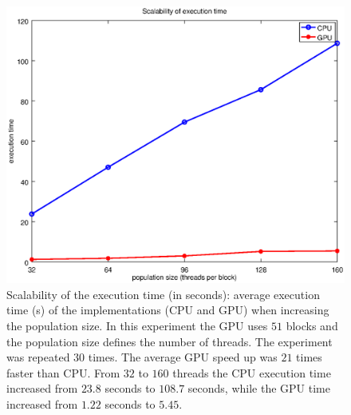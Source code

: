 \documentclass{article}
\begin{document}


    \begin{figure}[!htb]
        \centering
        \includegraphics[width=.7\textwidth]{../img/scalability_schafferf7_time.eps}
        \caption{Scalability of the execution time (in seconds): average execution time (s) of the implementations (CPU and GPU) when increasing the population size. In this experiment the GPU uses $51$ blocks and the population size defines the number of threads. The experiment was repeated $30$ times. The average GPU speed up was $21$ times faster than CPU. From $32$ to $160$  threads the CPU execution time increased from $23.8$ seconds to $108.7$ seconds, while the GPU time increased from $1.22$ seconds to $5.45$.}
        \label{fig:scalability_schafferf7_time}
    \end{figure}
\end{document}
